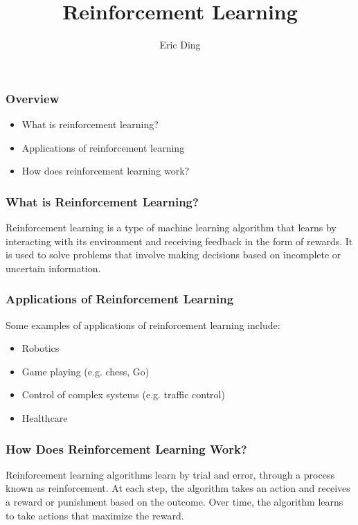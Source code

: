 \documentclass{beamer}
\title{Reinforcement Learning}
\author{Eric Ding}
\institute{University of Michigan}
\begin{document}
\begin{frame}
\titlepage
\end{frame}

\begin{frame}
\frametitle{Overview}

\begin{itemize}
\item What is reinforcement learning?
\item Applications of reinforcement learning
\item How does reinforcement learning work?
\end{itemize}

\end{frame}

\begin{frame}
\frametitle{What is Reinforcement Learning?}

Reinforcement learning is a type of machine learning algorithm that learns by interacting with its environment and receiving feedback in the form of rewards. It is used to solve problems that involve making decisions based on incomplete or uncertain information.

\end{frame}

\begin{frame}
\frametitle{Applications of Reinforcement Learning}

Some examples of applications of reinforcement learning include:

\begin{itemize}
\item Robotics
\item Game playing (e.g. chess, Go)
\item Control of complex systems (e.g. traffic control)
\item Healthcare
\end{itemize}

\end{frame}

\begin{frame}
\frametitle{How Does Reinforcement Learning Work?}

Reinforcement learning algorithms learn by trial and error, through a process known as reinforcement. At each step, the algorithm takes an action and receives a reward or punishment based on the outcome. Over time, the algorithm learns to take actions that maximize the reward.

\end{frame}
\end{document}

